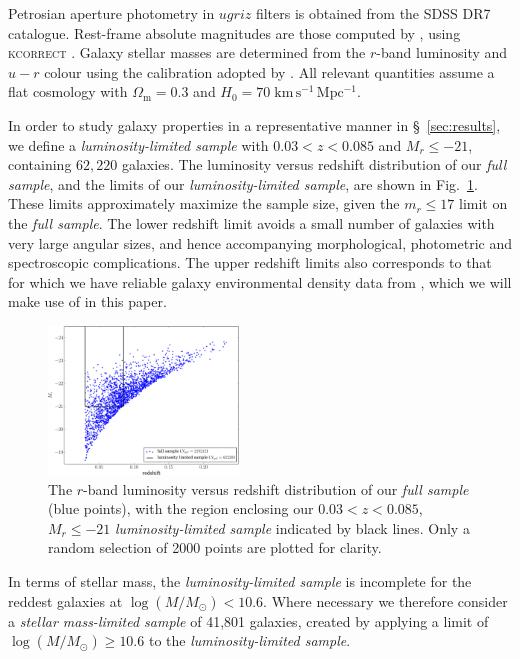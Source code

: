 \documentclass[useAMS,usenatbib]{mn2e}
\begin{document}
Petrosian aperture photometry in $ugriz$ filters is obtained from the SDSS DR7 catalogue. Rest-frame absolute magnitudes are those computed by \citet{Bamford_09}, using \textsc{kcorrect} \citep{Blanton_07}. Galaxy stellar masses are determined from the $r$-band luminosity and $u-r$ colour using the calibration adopted by \citet{Baldry_06}.
All relevant quantities assume a flat cosmology with $\Omega_\mathrm{m} = 0.3$ and $H_0 = 70\;\mathrm{km\,s^{-1}\,Mpc^{-1}}$.

In order to study galaxy properties in a representative manner in \S~\ref{sec:results}, we define a \textit{luminosity-limited sample} with $0.03<z<0.085$ and $M_r \le -21$, containing $62,220$ galaxies. The luminosity versus redshift distribution of our \textit{full sample}, and the limits of our \textit{luminosity-limited sample}, are shown in Fig.~\ref{fig:vl_sample}.  These limits approximately maximize the sample size, given the $m_r \le 17$ limit on the \textit{full sample}. The lower redshift limit avoids a small number of galaxies with very large angular sizes, and hence accompanying morphological, photometric and spectroscopic complications. The upper redshift limits also corresponds to that for which we have reliable galaxy environmental density data from \cite{Baldry_06}, which we will make use of in this paper.  

\begin{figure}
		\centering
		\includegraphics[width=0.45\textwidth]{Images/Data/volume_limited_sample-crop.pdf}
    \caption{The $r$-band luminosity versus redshift distribution of our \textit{full sample} (blue points), with the region enclosing our $0.03<z<0.085$, $M_r  \leq -21$ \textit{luminosity-limited sample} indicated by black lines. Only a random selection of 2000 points are plotted for clarity.
		\label{fig:vl_sample}}
\end{figure}

In terms of stellar mass, the \textit{luminosity-limited sample} is incomplete for the reddest galaxies at $\log (M/M_{\odot}) < 10.6$. Where necessary we therefore consider a \textit{stellar mass-limited sample} of 41,801 galaxies, created by applying a limit of $\log (M/M_{\odot}) \geq 10.6$ to the \textit{luminosity-limited sample}.
\end{document}
